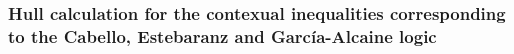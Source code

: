 \documentclass[%
  twocolumn,
 showpacs,
 showkeys,
 preprintnumbers,
 amsmath,amssymb,
 aps,
  pra,
  longbibliography,
 floatfix,
 ]{revtex4-1}
\begin{document}
%
%
%
%
%



\subsubsection{Hull calculation for the contexual inequalities corresponding to the Cabello, Estebaranz and Garc{\'{i}}a-Alcaine logic}
\end{document}

